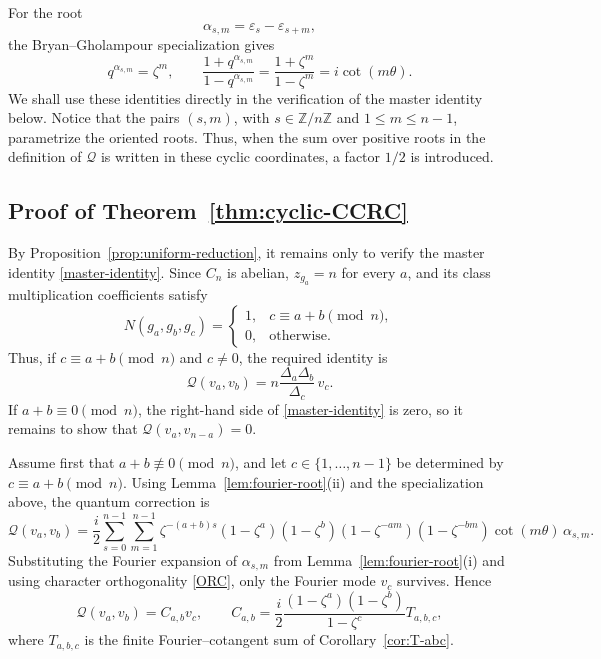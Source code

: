 \documentclass[a4paper,reqno]{amsart}
\theoremstyle{plain} %
\theoremstyle{definition} %
\theoremstyle{remark} %
\newcommand{\z}{\zeta}
\newcommand{\ve}{{\varepsilon}}
\newcommand{\1}{\mathds{1}}   %
\begin{document}

For the root
\[
\alpha_{s,m}= \ve_s - \ve_{s+m},
\]
the Bryan--Gholampour specialization gives
\[
q^{\alpha_{s,m}}=\z^m,
\qquad
\frac{1+q^{\alpha_{s,m}}}{1-q^{\alpha_{s,m}}}
=
\frac{1+\z^m}{1-\z^m}
=
i\cot(m\theta).
\]
We shall use these identities directly in the
verification of the master identity below.  Notice that the pairs
\((s,m)\), with \(s\in\mathbb Z/n\mathbb Z\) and
\(1\leq m\leq n-1\), parametrize the oriented roots.  Thus, when the
sum over positive roots in the definition of \(\mathcal Q\) is written
in these cyclic coordinates, a factor \(1/2\) is introduced.






\subsection{Proof of Theorem~\ref{thm:cyclic-CCRC}}

By Proposition~\ref{prop:uniform-reduction}, it remains only to verify the
master identity \eqref{master-identity}.  Since $C_n$ is abelian, $z_{g_a}=n$
for every $a$, and its class multiplication coefficients satisfy
\[
N(g_a,g_b,g_c)=
\begin{cases}
1,&c\equiv a+b\pmod n,\\
0,&\text{otherwise}.
\end{cases}
\]
Thus, if $c\equiv a+b\pmod n$ and $c\neq0$, the required identity is
\begin{equation}\label{eq:cyclic-master}
\mathcal Q(v_a,v_b)
=
n\frac{\Delta_a\Delta_b}{\Delta_c}\,v_c.
\end{equation}
If $a+b\equiv0\pmod n$, the right-hand side of
\eqref{master-identity} is zero, so it remains to show that
$\mathcal Q(v_a,v_{n-a})=0$.

Assume first that $a+b\not\equiv0\pmod n$, and let
$c\in\{1,\ldots,n-1\}$ be determined by $c\equiv a+b\pmod n$.
Using Lemma~\ref{lem:fourier-root}(ii) and the specialization above, the quantum correction is
\[
\mathcal Q(v_a,v_b)
=
\frac{i}{2}
\sum_{s=0}^{n-1}\sum_{m=1}^{n-1}
\z^{-(a+b)s}
(1-\z^a)(1-\z^b)
(1-\z^{-am})(1-\z^{-bm})
\cot(m\theta)\,\alpha_{s,m}.
\]
Substituting the Fourier expansion of $\alpha_{s,m}$ from
Lemma~\ref{lem:fourier-root}(i) and using character orthogonality
\eqref{ORC}, only the Fourier mode $v_c$ survives.  Hence
\[
\mathcal Q(v_a,v_b)=C_{a,b}v_c,
\qquad
C_{a,b}=\frac{i}{2}
\frac{(1-\z^a)(1-\z^b)}{1-\z^c}T_{a,b,c},
\]
where $T_{a,b,c}$ is the finite Fourier--cotangent sum of
Corollary~\ref{cor:T-abc}.
\end{document}
